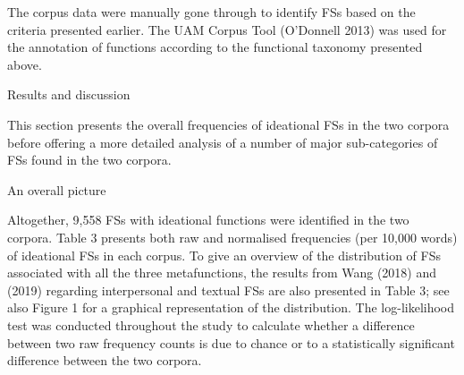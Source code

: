 \begin{styleStandard}
The corpus data were manually gone through to identify FSs based on the criteria presented earlier. The UAM Corpus Tool (O’Donnell 2013) was used for the annotation of functions according to the functional taxonomy presented above.
\end{styleStandard}

\begin{listWWNumxivleveli}
\item 
\begin{stylelsSectioni}
Results and discussion
\end{stylelsSectioni}
\end{listWWNumxivleveli}
\begin{styleStandard}
This section presents the overall frequencies of ideational FSs in the two corpora before offering a more detailed analysis of a number of major sub-categories of FSs found in the two corpora.
\end{styleStandard}

\begin{listWWNumxivleveli}
\item 
\begin{listWWNumxivlevelii}
\item 
\begin{stylelsSectionii}
An overall picture
\end{stylelsSectionii}
\end{listWWNumxivlevelii}
\end{listWWNumxivleveli}
\begin{styleStandard}
Altogether, 9,558 FSs with ideational functions were identified in the two corpora. Table 3 presents both raw and normalised frequencies (per 10,000 words) of ideational FSs in each corpus. To give an overview of the distribution of FSs associated with all the three metafunctions, the results from Wang (2018) and (2019) regarding interpersonal and textual FSs are also presented in Table 3; see also Figure 1 for a graphical representation of the distribution. The log-likelihood test was conducted throughout the study to calculate whether a difference between two raw frequency counts is due to chance or to a statistically significant difference between the two corpora. 
\end{styleStandard}

